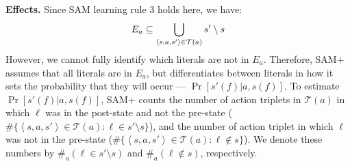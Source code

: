 \documentclass[letterpaper]{article} %
\newcommand{\tuple}[1]{\ensuremath{\left \langle #1 \right \rangle }}
\begin{document}
\noindent \textbf{Effects.} 
Since SAM learning rule 3 holds here, we have:
\begin{equation}
\small
        E_a \subseteq  \bigcup_{\tuple{s, a, s'}\in \mathcal{T}(a)} s'\setminus s \label{eq:eff}
\end{equation} 
However, we cannot fully identify which literals are not in $E_a$. 
Therefore, SAM+ assumes that all literals are in $E_a$, but differentiates between literals in how it sets the probability that they will occur --- $\Pr[s'(f)|a,s(f)]$. 
To estimate $\Pr[s'(f)|a,s(f)]$, SAM+ counts the number of action triplets in $\mathcal{T}(a)$ in which $\ell$ was in the post-state and not the pre-state 
($\#\{\tuple{s, a, s'}\in \mathcal{T}(a):\ell\in s'\setminus s\}$), 
and the number of action triplet in which $\ell$ was not in the pre-state 
($\#\{\tuple{s, a, s'}\in \mathcal{T}(a):\ell\notin s\}$). 
We denote these numbers by $\#_a(\ell\in s'\setminus s)$ and $\#_a(\ell\notin s)$, respectively. 

\end{document}
